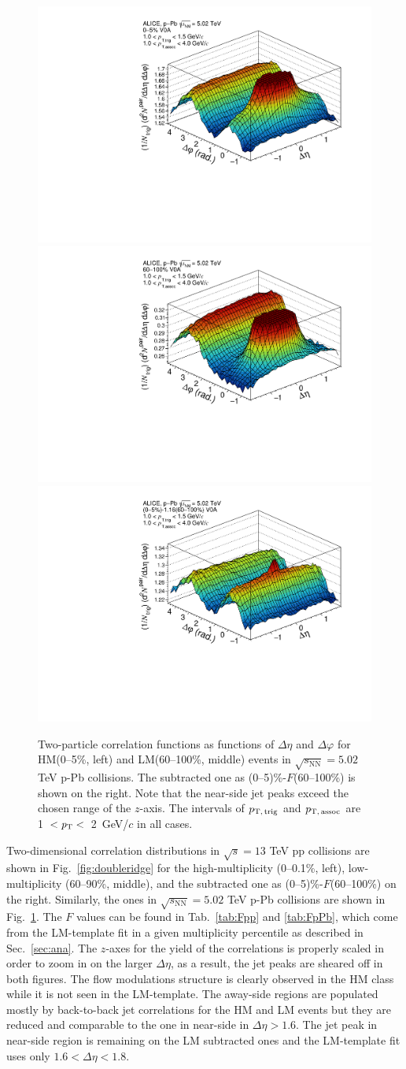 \begin{figure}[h!]
			\includegraphics[width=0.3 \textwidth]{figures/corr_1_0_6.pdf}
			\includegraphics[width=0.3 \textwidth]{figures/corr_1_5_6.pdf}
			\includegraphics[width=0.3 \textwidth]{figures/corr_sub_temp_1_0_6.pdf}
\caption{Two-particle correlation functions as functions of $\Delta\eta$ and $\Delta\varphi$ for HM(0--5\%, left) and LM(60--100\%, middle) events in $\sqrt{s_{\mathrm{NN}}}=5.02$ TeV p-Pb collisions. The subtracted one as (0--5)\%-$F$(60--100\%) is shown on the right. Note that the near-side jet peaks exceed the chosen range of the $z$-axis. The intervals of $p_\mathrm{T,\,trig}$ and $p_\mathrm{T,\,assoc}$ are 1~$<\it{p}_{\rm{T}}<$~2~GeV/$c$ in all cases.}
\label{fig:doubleridgepPb}
\end{figure}

Two-dimensional correlation distributions in $\sqrt{s}=13$ TeV pp collisions are shown in Fig.~\ref{fig:doubleridge} for the high-multiplicity (0--0.1\%, left), low-multiplicity (60--90\%, middle), and the subtracted one as (0--5)\%-$F$(60--100\%) on the right. Similarly, the ones in $\sqrt{s_{\mathrm{NN}}}=5.02$ TeV p-Pb collisions are shown in Fig.~\ref{fig:doubleridgepPb}. The $F$ values can be found in Tab.~\ref{tab:Fpp} and \ref{tab:FpPb}, which come from the LM-template fit in a given multiplicity percentile as described in Sec.~\ref{sec:ana}. 
The $z$-axes for the yield of the correlations is properly scaled in order to zoom in on the larger $\Delta\eta$, as a result, the jet peaks are sheared off in both figures. The flow modulations structure is clearly observed in the HM class while it is not seen in the LM-template. The away-side regions are populated mostly by back-to-back jet correlations for the HM and LM events but they are reduced and comparable to the one in near-side in $\Delta\eta > 1.6$. The jet peak in near-side region is remaining on the LM subtracted ones and the LM-template fit uses only $1.6< \Delta\eta < 1.8$.


